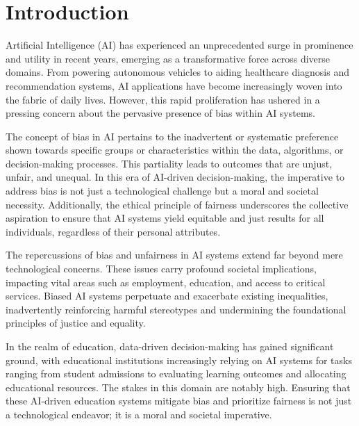 \documentclass[12pt,a4paper,openright,twoside]{book}
\begin{document}
\mainmatter

\chapter{Introduction}
\label{chap:introduction}

Artificial Intelligence (AI) has experienced an unprecedented surge in prominence and utility in recent years, emerging as a transformative force across diverse domains. From powering autonomous vehicles to aiding healthcare diagnosis and recommendation systems, AI applications have become increasingly woven into the fabric of daily lives. However, this rapid proliferation has ushered in a pressing concern about the pervasive presence of bias within AI systems.

The concept of bias in AI pertains to the inadvertent or systematic preference shown towards specific groups or characteristics within the data, algorithms, or decision-making processes. This partiality leads to outcomes that are unjust, unfair, and unequal. In this era of AI-driven decision-making, the imperative to address bias is not just a technological challenge but a moral and societal necessity. Additionally, the ethical principle of fairness underscores the collective aspiration to ensure that AI systems yield equitable and just results for all individuals, regardless of their personal attributes.

The repercussions of bias and unfairness in AI systems extend far beyond mere technological concerns. These issues carry profound societal implications, impacting vital areas such as employment, education, and access to critical services. Biased AI systems perpetuate and exacerbate existing inequalities, inadvertently reinforcing harmful stereotypes and undermining the foundational principles of justice and equality.

In the realm of education, data-driven decision-making has gained significant ground, with educational institutions increasingly relying on AI systems for tasks ranging from student admissions to evaluating learning outcomes and allocating educational resources. The stakes in this domain are notably high. Ensuring that these AI-driven education systems mitigate bias and prioritize fairness is not just a technological endeavor; it is a moral and societal imperative.
\end{document}
